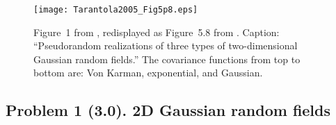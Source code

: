 \documentclass[11pt,titlepage,fleqn]{article}
\begin{document}
\clearpage\pagebreak

\begin{figure}
\centering
\texttt{[image: Tarantola2005\_Fig5p8.eps]}
%
\caption[]
{{
Figure~1 from \citet{FrankelClayton1986}, redisplayed as Figure~5.8 from \citet{Tarantola2005}. Caption: ``Pseudorandom realizations of three types of two-dimensional Gaussian random fields.'' The covariance functions from top to bottom are: Von Karman, exponential, and Gaussian.
\label{fig:frankel}
}}
\end{figure}


\clearpage\pagebreak
\subsection*{Problem 1 (3.0). 2D Gaussian random fields}
\end{document}
